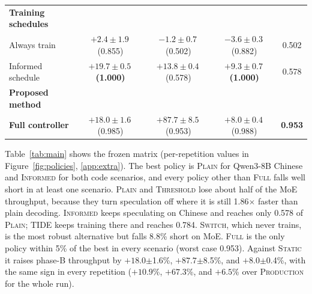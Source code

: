 \documentclass{article}
\newcommand{\pol}[1]{\textsc{#1}}
\begin{document}
\begin{table}[t]
\begin{tabular}{@{}lcccc@{}}
\addlinespace[3pt]

\rowcolor{tabGroup}
\textbf{\footnotesize Training schedules}
& & & & \\

Always train
& $+2.4\pm1.9$\,{\scriptsize(0.855)}
& $-1.2\pm0.7$\,{\scriptsize(0.502)}
& $-3.6\pm0.3$\,{\scriptsize(0.882)}
& 0.502 \\

\cellcolor{tabOracle}Informed schedule
& \cellcolor{tabBest}
  $\boldsymbol{+19.7\pm0.5}$\,{\scriptsize\bfseries(1.000)}
& $+13.8\pm0.4$\,{\scriptsize(0.578)}
& \cellcolor{tabBest}
  $\boldsymbol{+9.3\pm0.7}$\,{\scriptsize\bfseries(1.000)}
& 0.578 \\

\addlinespace[3pt]

\rowcolor{tabGroup}
\textbf{\footnotesize Proposed method}
& & & & \\

\rowcolor{tabFull}
\textbf{Full controller}
& $+18.0\pm1.6$\,{\scriptsize(0.985)}
& $+87.7\pm8.5$\,{\scriptsize(0.953)}
& $+8.0\pm0.4$\,{\scriptsize(0.988)}
& \cellcolor{tabBest}\textbf{0.953} \\

\bottomrule
\end{tabular}

\end{table}

Table~\ref{tab:main} shows the frozen matrix (per-repetition values in Figure~\ref{fig:policies}, \cref{app:extra}). The best policy is \pol{Plain} for Qwen3-8B Chinese and \pol{Informed} for both code scenarios, and every policy other than \pol{Full} falls well short in at least one scenario. \pol{Plain} and \pol{Threshold} lose about half of the MoE throughput, because they turn speculation off where it is still 1.86$\times$ faster than plain decoding. \pol{Informed} keeps speculating on Chinese and reaches only 0.578 of \pol{Plain}; \pol{TIDE} keeps training there and reaches 0.784. \pol{Switch}, which never trains, is the most robust alternative but falls 8.8\% short on MoE. \pol{Full} is the only policy within 5\% of the best in every scenario (worst case 0.953). Against \pol{Static} it raises phase-B throughput by $+18.0$$\pm$1.6\%, $+87.7$$\pm$8.5\%, and $+8.0$$\pm$0.4\%, with the same sign in every repetition ($+10.9$\%, $+67.3$\%, and $+6.5$\% over \pol{Production} for the whole run).
\end{document}
